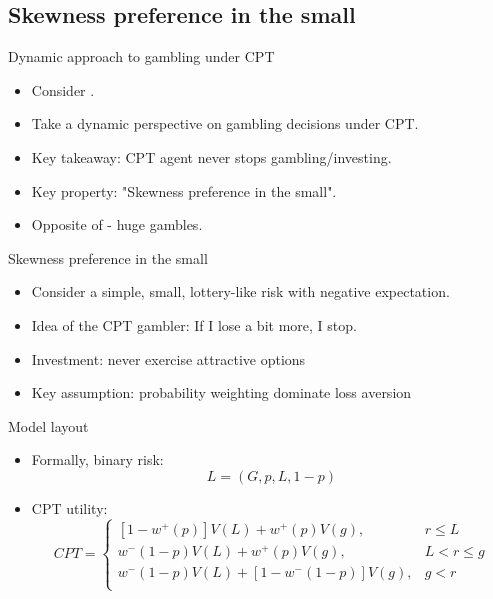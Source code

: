 \documentclass[11pt, aspectratio=169]{beamer}
\begin{document}
\subsection{Skewness preference in the small}


\begin{frame}{Dynamic approach to gambling under CPT}
    \begin{itemize}
        \item Consider \citet{EbertStrack2015}.\medskip
        \item Take a dynamic perspective on gambling decisions under CPT.\medskip
        \item Key takeaway: CPT agent never stops gambling/investing.\medskip
        \item Key property: "Skewness preference in the small".\medskip
        \item Opposite of \citet{AzevedoGottlieb2012} - huge gambles.\medskip
	\end{itemize}
\end{frame}

\begin{frame}{Skewness preference in the small}
    \begin{itemize}
        \item Consider a simple, small, lottery-like risk with negative expectation.\medskip
        \item Idea of the CPT gambler: If I lose a bit more, I stop.\medskip
        \item Investment: never exercise attractive  options\medskip
        \item Key assumption: probability weighting dominate loss aversion\medskip
	\end{itemize}
\end{frame}

\begin{frame}{Model layout}
    \begin{itemize}
        \item Formally, binary risk: \[L = (G, p, L, 1 - p)\]\medskip
        \item CPT utility:
    \begin{equation}
        CPT = \begin{cases}
        [1-w^+(p)]V(L)+w^+(p)V(g),  & r \leq  L\\
        w^-(1-p)V(L)+w^+(p)V(g) ,  & L< r \leq g \\
        w^-(1-p)V(L)+[1-w^-(1-p)]V(g),  & g< r\\
        \end{cases}
    \end{equation}
\end{itemize}
\end{frame}
\end{document}
